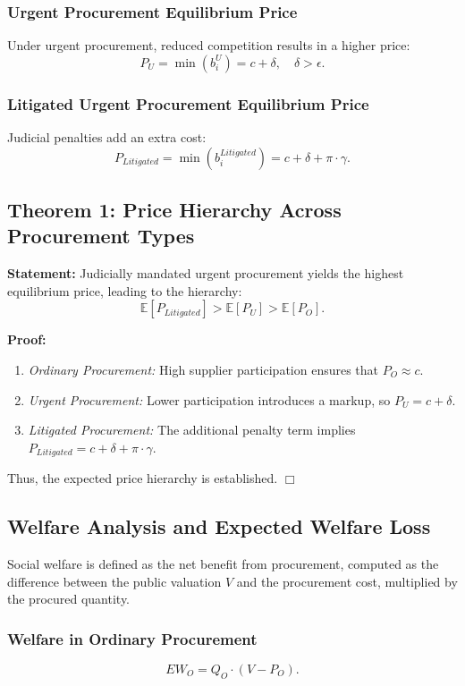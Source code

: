 \subsubsection{Urgent Procurement Equilibrium Price}
Under urgent procurement, reduced competition results in a higher price:
\[
P_U = \min(b_i^{U}) = c + \delta, \quad \delta > \epsilon.
\]

\subsubsection{Litigated Urgent Procurement Equilibrium Price}
Judicial penalties add an extra cost:
\[
P_{Litigated} = \min(b_i^{Litigated}) = c + \delta + \pi \cdot \gamma.
\]

\subsection{Theorem 1: Price Hierarchy Across Procurement Types}

\textbf{Statement:} Judicially mandated urgent procurement yields the highest equilibrium price, leading to the hierarchy:
\[
\mathbb{E}[P_{Litigated}] > \mathbb{E}[P_U] > \mathbb{E}[P_O].
\]

\textbf{Proof:}
\begin{enumerate}
    \item \textit{Ordinary Procurement:} High supplier participation ensures that \(P_O \approx c\).
    \item \textit{Urgent Procurement:} Lower participation introduces a markup, so \(P_U = c + \delta\).
    \item \textit{Litigated Procurement:} The additional penalty term implies \(P_{Litigated} = c + \delta + \pi \cdot \gamma\).
\end{enumerate}
Thus, the expected price hierarchy is established. \(\Box\)

\subsection{Welfare Analysis and Expected Welfare Loss}
Social welfare is defined as the net benefit from procurement, computed as the difference between the public valuation \(V\) and the procurement cost, multiplied by the procured quantity.

\subsubsection{Welfare in Ordinary Procurement}
\[
EW_O = Q_O \cdot (V - P_O).
\]

